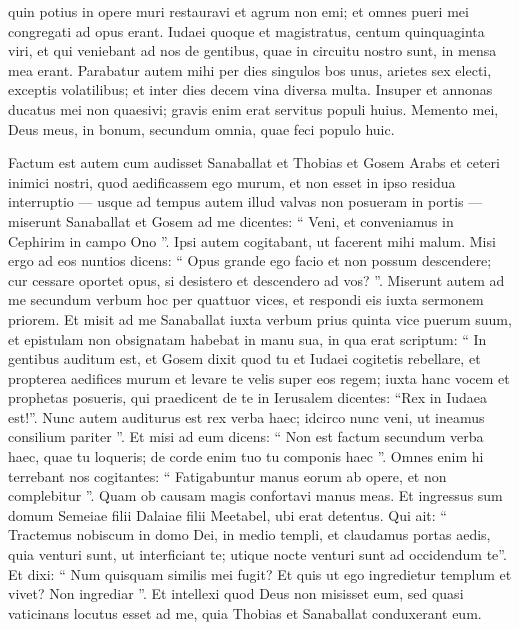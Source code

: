 \begin{biblechapter}
\begin{biblechapter}
\begin{biblechapter}
\begin{biblechapter}
\begin{biblechapter}
\verse quin potius in opere muri restauravi et agrum non emi; et omnes pueri mei congregati ad opus erant.
 \verse Iudaei quoque et magistratus, centum quinquaginta viri, et qui veniebant ad nos de gentibus, quae in circuitu nostro sunt, in mensa mea erant. 
\verse Parabatur autem mihi per dies singulos bos unus, arietes sex electi, exceptis volatilibus; et inter dies decem vina diversa multa. Insuper et annonas ducatus mei non quaesivi; gravis enim erat servitus populi huius.
 \verse Memento mei, Deus meus, in bonum, secundum omnia, quae feci populo huic.
 
\begin{biblechapter}
\verse Factum est autem cum audisset Sanaballat et Thobias et Gosem Arabs et ceteri inimici nostri, quod aedificassem ego murum, et non esset in ipso residua interruptio — usque ad tempus autem illud valvas non posueram in portis — 
\verse miserunt Sanaballat et Gosem ad me dicentes: “ Veni, et conveniamus in Cephirim in campo Ono ”. Ipsi autem cogitabant, ut facerent mihi malum. 
\verse Misi ergo ad eos nuntios dicens: “ Opus grande ego facio et non possum descendere; cur cessare oportet opus, si desistero et descendero ad vos? ”. 
\verse Miserunt autem ad me secundum verbum hoc per quattuor vices, et respondi eis iuxta sermonem priorem.
 \verse Et misit ad me Sanaballat iuxta verbum prius quinta vice puerum suum, et epistulam non obsignatam habebat in manu sua, in qua erat scriptum: 
\verse “ In gentibus auditum est, et Gosem dixit quod tu et Iudaei cogitetis rebellare, et propterea aedifices murum et levare te velis super eos regem; iuxta hanc vocem 
 \verse et prophetas posueris, qui praedicent de te in Ierusalem dicentes: “Rex in Iudaea est!”. Nunc autem auditurus est rex verba haec; idcirco nunc veni, ut ineamus consilium pariter ”. 
\verse Et misi ad eum dicens: “ Non est factum secundum verba haec, quae tu loqueris; de corde enim tuo tu componis haec ”. 
 \verse Omnes enim hi terrebant nos cogitantes: “ Fatigabuntur manus eorum ab opere, et non complebitur ”. Quam ob causam magis confortavi manus meas.
 \verse Et ingressus sum domum Semeiae filii Dalaiae filii Meetabel, ubi erat detentus. Qui ait: “ Tractemus nobiscum in domo Dei, in medio templi, et claudamus portas aedis, quia venturi sunt, ut interficiant te; utique nocte venturi sunt ad occidendum te”.
 \verse Et dixi: “ Num quisquam similis mei fugit? Et quis ut ego ingredietur templum et vivet? Non ingrediar ”. 
\verse Et intellexi quod Deus non misisset eum, sed quasi vaticinans locutus esset ad me, quia Thobias et Sanaballat conduxerant eum. 

\end{biblechapter}
\end{biblechapter}
\end{biblechapter}
\end{biblechapter}
\end{biblechapter}
\end{biblechapter}
